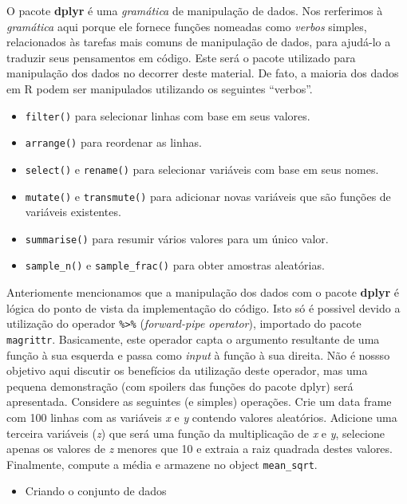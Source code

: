 \documentclass[
]{book}
\providecommand{\tightlist}{%
  \setlength{\itemsep}{0pt}\setlength{\parskip}{0pt}}
\numberwithin{equation}{section}
\begin{document}
O pacote \textbf{dplyr} é uma \emph{gramática} de manipulação de dados. Nos rerferimos à \emph{gramática} aqui porque ele fornece funções nomeadas como \emph{verbos} simples, relacionados às tarefas mais comuns de manipulação de dados, para ajudá-lo a traduzir seus pensamentos em código. Este será o pacote utilizado para manipulação dos dados no decorrer deste material. De fato, a maioria dos dados em R podem ser manipulados utilizando os seguintes ``verbos''.

\begin{itemize}
\tightlist
\item
  \texttt{filter()} para selecionar linhas com base em seus valores.
\item
  \texttt{arrange()} para reordenar as linhas.
\item
  \texttt{select()} e \texttt{rename()} para selecionar variáveis com base em seus nomes.
\item
  \texttt{mutate()} e \texttt{transmute()} para adicionar novas variáveis que são funções de variáveis existentes.
\item
  \texttt{summarise()} para resumir vários valores para um único valor.
\item
  \texttt{sample\_n()} e \texttt{sample\_frac()} para obter amostras aleatórias.
\end{itemize}

Anteriomente mencionamos que a manipulação dos dados com o pacote \textbf{dplyr} é lógica do ponto de vista da implementação do código. Isto só é possivel devido a utilização do operador \texttt{\%\textgreater{}\%} (\emph{forward-pipe operator}), importado do pacote \texttt{magrittr}. Basicamente, este operador capta o argumento resultante de uma função à sua esquerda e passa como \emph{input} à função à sua direita. Não é nossso objetivo aqui discutir os benefícios da utilização deste operador, mas uma pequena demonstração (com spoilers das funções do pacote dplyr) será apresentada. Considere as seguintes (e simples) operações. Crie um data frame com 100 linhas com as variáveis \emph{x} e \emph{y} contendo valores aleatórios. Adicione uma terceira variáveis (\emph{z}) que será uma função da multiplicação de \emph{x} e \emph{y}, selecione apenas os valores de \emph{z} menores que 10 e extraia a raiz quadrada destes valores. Finalmente, compute a média e armazene no object \texttt{mean\_sqrt}.

\begin{itemize}
\tightlist
\item
  Criando o conjunto de dados
\end{itemize}
\end{document}
